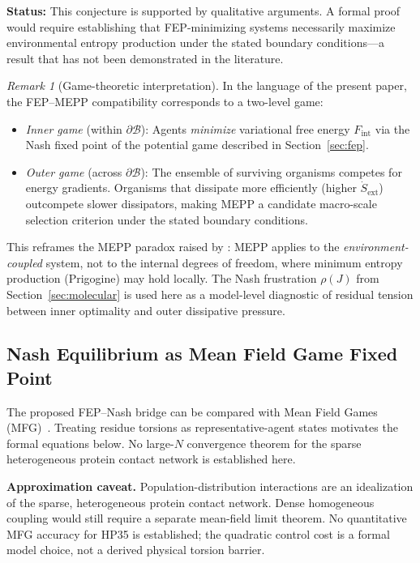\documentclass[12pt,a4paper]{article}
\theoremstyle{remark}
\newtheorem{remark}{Remark}
\begin{document}
\noindent\textbf{Status:} This conjecture is supported by qualitative arguments. A formal proof would require establishing that FEP-minimizing systems necessarily maximize environmental entropy production under the stated boundary conditions---a result that has not been demonstrated in the literature.

\begin{remark}[Game-theoretic interpretation]
In the language of the present paper, the FEP--MEPP compatibility
corresponds to a two-level game:
\begin{itemize}
  \item \emph{Inner game} (within $\partial\mathcal{B}$): Agents
    \emph{minimize} variational free energy $F_{\mathrm{int}}$ via the
    Nash fixed point of the potential game described in
    Section~\ref{sec:fep}.
  \item \emph{Outer game} (across $\partial\mathcal{B}$):
    The ensemble of surviving organisms competes for energy
    gradients. Organisms that dissipate more efficiently
    (higher $\dot{S}_{\mathrm{ext}}$) outcompete slower
    dissipators, making MEPP a candidate macro-scale selection
    criterion under the stated boundary conditions.
\end{itemize}
This reframes the MEPP paradox raised by
\citet{Martyushev2010}: MEPP applies to the
\emph{environment-coupled} system, not to the internal degrees
of freedom, where minimum entropy production (Prigogine) may
hold locally. The Nash frustration $\rho(J)$ from
Section~\ref{sec:molecular} is used here as a model-level diagnostic of residual tension
between inner optimality and outer dissipative pressure.
\end{remark}

\subsection{Nash Equilibrium as Mean Field Game Fixed Point}\label{sec:mfg-fixpoint}

The proposed FEP--Nash bridge can be compared with Mean Field Games (MFG)~\citep{LasryLions2007}. Treating residue torsions as representative-agent states motivates the formal equations below. No large-$N$ convergence theorem for the sparse heterogeneous protein contact network is established here.

\textbf{Approximation caveat.} Population-distribution interactions are an idealization of the sparse, heterogeneous protein contact network. Dense homogeneous coupling would still require a separate mean-field limit theorem. No quantitative MFG accuracy for HP35 is established; the quadratic control cost is a formal model choice, not a derived physical torsion barrier.
\end{document}
